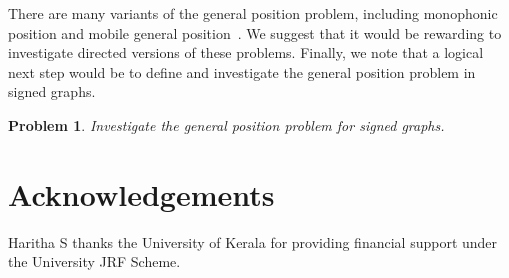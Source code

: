\documentclass[a4paper,12pt]{article}
\newtheorem{problem}[theorem]{Problem}
\theoremstyle{definition}
\begin{document}
	There are many variants of the general position problem, including monophonic position and mobile general position~\cite{survey}. We suggest that it would be rewarding to investigate directed versions of these problems. Finally, we note that a logical next step would be to define and investigate the general position problem in signed graphs.
	
	\begin{problem}
		Investigate the general position problem for signed graphs.
	\end{problem}
	
	
	
	
	
	
	
	\section*{Acknowledgements}
	Haritha S thanks the University of Kerala for providing financial support under the University JRF Scheme. 
	
	
	
	
\end{document}
